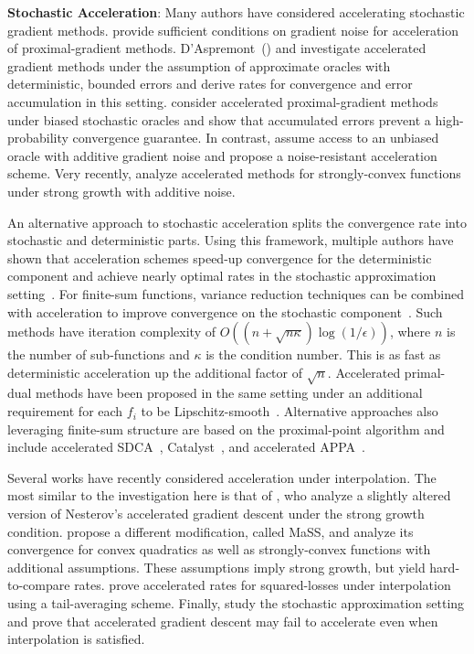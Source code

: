 \noindent \textbf{Stochastic Acceleration}: 
Many authors have considered accelerating stochastic gradient methods.
\citet{schmidt2011convergence} provide sufficient conditions on gradient noise for acceleration of proximal-gradient methods.
D'Aspremont~(\citeyear{aspremont2008approximate}) and \citet{devolder2014first} investigate accelerated gradient methods under the assumption of approximate oracles with deterministic, bounded errors and derive rates for convergence and error accumulation in this setting.
\citet{honorio2012biased} consider accelerated proximal-gradient methods under biased stochastic oracles and show that accumulated errors prevent a high-probability convergence guarantee. 
In contrast, \citet{cohen2018acceleration} assume access to an unbiased oracle with additive gradient noise and propose a noise-resistant acceleration scheme.
Very recently, \citet{chen2020understanding} analyze accelerated methods for strongly-convex functions under strong growth with additive noise. 

An alternative approach to stochastic acceleration splits the convergence rate into stochastic and deterministic parts.
Using this framework, multiple authors have shown that acceleration schemes speed-up convergence for the deterministic component and achieve nearly optimal rates in the stochastic approximation setting~\citep{ghadimi2012optimal1, ghadimi2013optimal2, hu2009accelerated}.
For finite-sum functions, variance reduction techniques can be combined with acceleration to improve convergence on the stochastic component~\citep{allen-zhu2017katyusha, defazio2016pointSaga, allen-zhou2018katyushax, tang2018restkatyusha, shang2018asvrg, kovalev2020loopless}.
Such methods have iteration complexity of \( O((n + \sqrt{n\kappa}) \log(1/\epsilon)) \), where \( n \) is the number of sub-functions and \( \kappa \) is the condition number.
This is as fast as deterministic acceleration up the additional factor of \( \sqrt{n} \). 
Accelerated primal-dual methods have been proposed in the same setting under an additional requirement for each \( f_i \) to be Lipschitz-smooth~\citep{zhang2015SPDC, lan2018incremental}.
Alternative approaches also leveraging finite-sum structure are based on the proximal-point algorithm and include accelerated SDCA~\citep{shalev-shwarz2014ASDCA}, Catalyst~\citep{lin2015catalyst}, and accelerated APPA~\citep{frostig2015unregularizing}.

Several works have recently considered acceleration under interpolation.
The most similar to the investigation here is that of \citet{vaswani2019fast}, who analyze a slightly altered version of Nesterov's accelerated gradient descent under the strong growth condition. 
\citet{liu2020accelerating} propose a different modification, called MaSS, and analyze its convergence for convex quadratics as well as strongly-convex functions with additional assumptions. 
These assumptions imply strong growth, but yield hard-to-compare rates. 
\citet{jain2018accelerating} prove accelerated rates for squared-losses under interpolation using a tail-averaging scheme. 
Finally, \citet{assran2020convergence} study the stochastic approximation setting and prove that accelerated gradient descent may fail to accelerate even when interpolation is satisfied.\\

